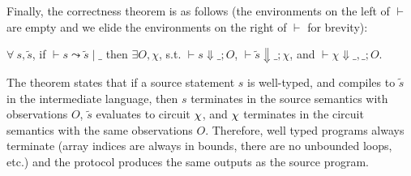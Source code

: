 Finally, the correctness theorem is as follows (the environments on
the left of $\vdash$ are empty and we elide the environments on the
right of $\vdash$ for brevity):

\begin{theorem}[Correctness]\label{theorem:correctness}
 $\forall\: s, \widetilde{s}$, if $\vdash s \leadsto \widetilde{s}
  \mid \_$  then $\exists  O , \chi$, s.t.  $\vdash s \Downarrow \_;
  O$, $ \vdash \widetilde{s} \Downarrow \_; \chi$, and $ \vdash \chi
  \Downarrow \_, \_; O$.
\end{theorem}

The theorem states that if a source statement $s$ is well-typed, and
compiles to $\widetilde{s}$ in the intermediate language, then $s$ terminates in the source
semantics with observations $O$, $\widetilde{s}$ evaluates to circuit $\chi$, and $\chi$ terminates in the
circuit semantics with the same observations $O$. 
Therefore, well typed programs always terminate (array indices are always in bounds, there are no unbounded loops, etc.) and the \mpc protocol produces the same outputs as the source program.
%
%
